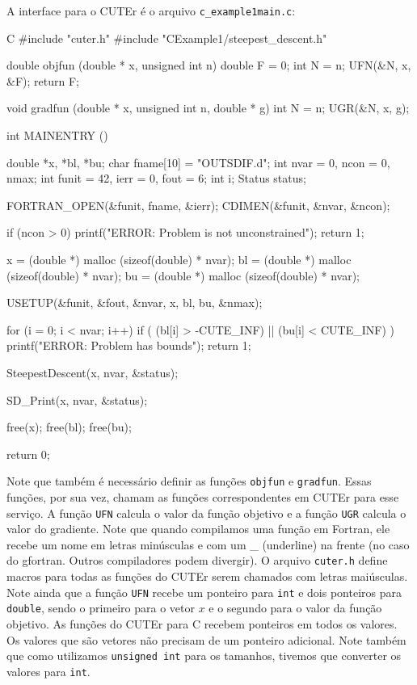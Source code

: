 \documentclass[letterpaper,11pt]{article}
\numberwithin{equation}{section}
\begin{document}
A interface para o CUTEr é o arquivo \verb+c_example1main.c+:
\scriptsize
\begin{code}{C}
#include "cuter.h"
#include "CExample1/steepest_descent.h"

double objfun (double * x, unsigned int n) {
  double F = 0;
  int N = n;
  UFN(&N, x, &F);
  return F;
}

void gradfun (double * x, unsigned int n, double * g) {
  int N = n;
  UGR(&N, x, g);
}

int MAINENTRY () {
  double *x, *bl, *bu;
  char fname[10] = "OUTSDIF.d";
  int nvar = 0, ncon = 0, nmax;
  int funit = 42, ierr = 0, fout = 6;
  int i;
  Status status;

  FORTRAN_OPEN(&funit, fname, &ierr);
  CDIMEN(&funit, &nvar, &ncon);

  if (ncon > 0) {
    printf("ERROR: Problem is not unconstrained\n");
    return 1;
  }

  x  = (double *) malloc (sizeof(double) * nvar);
  bl = (double *) malloc (sizeof(double) * nvar);
  bu = (double *) malloc (sizeof(double) * nvar);

  USETUP(&funit, &fout, &nvar, x, bl, bu, &nmax);

  for (i = 0; i < nvar; i++) {
    if ( (bl[i] > -CUTE_INF) || (bu[i] < CUTE_INF) ) {
      printf("ERROR: Problem has bounds\n");
      return 1;
    }
  }

  SteepestDescent(x, nvar, &status);

  SD_Print(x, nvar, &status);

  free(x);
  free(bl);
  free(bu);

  return 0;
}
\end{code}
\normalsize
Note que também é necessário definir as funções \verb+objfun+ e \verb+gradfun+. Essas
funções, por sua vez, chamam as funções correspondentes em CUTEr para esse serviço.
A função \verb+UFN+ calcula o valor da função objetivo e a função \verb+UGR+ calcula
o valor do gradiente. Note que quando compilamos uma função em Fortran, ele recebe um
nome em letras minúsculas e com um \_ (underline) na frente (no caso do gfortran. Outros
compiladores podem divergir). O arquivo \verb+cuter.h+ define macros para todas as funções
do CUTEr serem chamados com letras maiúsculas. Note ainda que a função \verb+UFN+ recebe
um ponteiro para \verb+int+ e dois ponteiros para \verb+double+, sendo o primeiro para o
vetor $x$ e o segundo para o valor da função objetivo. As funções do CUTEr para C recebem
ponteiros em todos os valores. Os valores que são vetores não precisam de um ponteiro 
adicional. Note também que como utilizamos \verb+unsigned int+ para os tamanhos, tivemos
que converter os valores para \verb+int+.
\end{document}
